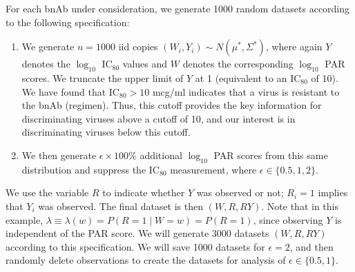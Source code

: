 \documentclass[10pt]{article}
\begin{document}
For each bnAb under consideration, we generate 1000 random datasets according to the following specification:
\begin{enumerate}
    \item We generate $n = 1000$ iid copies $(W_i, Y_i) \sim N(\mu^*, \Sigma^*)$, where again $Y$ denotes the $\log_{10}$ IC$_{80}$ values and $W$ denotes the corresponding $\log_{10}$ PAR scores. We truncate the upper limit of $Y$ at 1 (equivalent to an IC$_{80}$ of 10). We have found that IC$_{80} > 10$ mcg/ml indicates that a virus is resistant to the bnAb (regimen). Thus, this cutoff provides the key information for discriminating viruses above a cutoff of 10, and our interest is in discriminating viruses below this cutoff.
    \item We then generate $\epsilon \times 100$\% additional $\log_{10}$ PAR scores from this same distribution and suppress the IC$_{80}$ measurement, where $\epsilon \in \{0.5, 1, 2\}$.
\end{enumerate}
We use the variable $R$ to indicate whether $Y$ was observed or not; $R_i = 1$ implies that $Y_i$ was observed. The final dataset is then $(W, R, RY)$. Note that in this example, $\lambda \equiv \lambda(w) = P(R = 1 \mid W = w) = P(R = 1)$, since observing $Y$ is independent of the PAR score. We will generate 3000 datasets $(W, R, RY)$ according to this specification. We will save 1000 datasets for $\epsilon = 2$, and then randomly delete observations to create the datasets for analysis of $\epsilon \in \{0.5, 1\}$.
\end{document}
